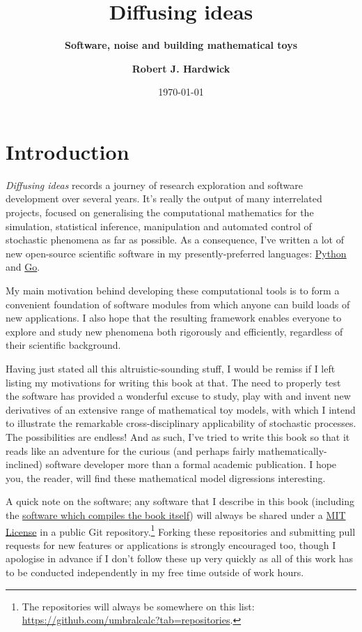 \documentclass{book}
\title{\Huge \bfseries\sffamily Diffusing ideas}
\subtitle{\Large \bfseries\sffamily \color{gray75} Software, noise and building mathematical toys}
\author{\bfseries\sffamily Robert J. Hardwick}
\date{\today}
\begin{document}
\maketitle
\frontmatter

\chapter*{Introduction}

\emph{Diffusing ideas} records a journey of research exploration and software development over several years. It's really the output of many interrelated projects, focused on generalising the computational mathematics for the simulation, statistical inference, manipulation and automated control of stochastic phenomena as far as possible. As a consequence, I've written a lot of new open-source scientific software in my presently-preferred languages: \href{https://www.python.org/}{Python} and \href{https://go.dev/}{Go}. 

My main motivation behind developing these computational tools is to form a convenient foundation of software modules from which anyone can build loads of new applications. I also hope that the resulting framework enables everyone to explore and study new phenomena both rigorously and efficiently, regardless of their scientific background.  

Having just stated all this altruistic-sounding stuff, I would be remiss if I left listing my motivations for writing this book at that. The need to properly test the software has provided a wonderful excuse to study, play with and invent new derivatives of an extensive range of mathematical toy models, with which I intend to illustrate the remarkable cross-disciplinary applicability of stochastic processes. The possibilities are endless! And as such, I've tried to write this book so that it reads like an adventure for the curious (and perhaps fairly mathematically-inclined) software developer more than a formal academic publication. I hope you, the reader, will find these mathematical model digressions interesting.

A quick note on the software; any software that I describe in this book (including the \href{https://github.com/umbralcalc/diffusing-ideas}{software which compiles the book itself}) will always be shared under a \href{https://opensource.org/licenses/MIT}{MIT License} in a public Git repository.\footnote{The repositories will always be somewhere on this list: \href{https://github.com/umbralcalc?tab=repositories}{https://github.com/umbralcalc?tab=repositories}.} Forking these repositories and submitting pull requests for new features or applications is strongly encouraged too, though I apologise in advance if I don't follow these up very quickly as all of this work has to be conducted independently in my free time outside of work hours.
\end{document}
